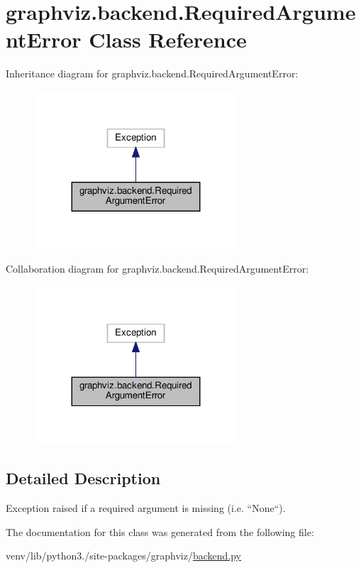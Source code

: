 \hypertarget{classgraphviz_1_1backend_1_1RequiredArgumentError}{}\section{graphviz.\+backend.\+Required\+Argument\+Error Class Reference}
\label{classgraphviz_1_1backend_1_1RequiredArgumentError}


Inheritance diagram for graphviz.\+backend.\+Required\+Argument\+Error\+:
\nopagebreak
\begin{figure}[H]
\begin{center}
\leavevmode
\includegraphics[width=215pt]{classgraphviz_1_1backend_1_1RequiredArgumentError__inherit__graph}
\end{center}
\end{figure}


Collaboration diagram for graphviz.\+backend.\+Required\+Argument\+Error\+:
\nopagebreak
\begin{figure}[H]
\begin{center}
\leavevmode
\includegraphics[width=215pt]{classgraphviz_1_1backend_1_1RequiredArgumentError__coll__graph}
\end{center}
\end{figure}


\subsection{Detailed Description}
\begin{DoxyVerb}Exception raised if a required argument is missing (i.e. ``None``).\end{DoxyVerb}
 

The documentation for this class was generated from the following file\+:\begin{DoxyCompactItemize}
\item 
venv/lib/python3./site-\/packages/graphviz/\hyperlink{backend_8py}{backend.\+py}\end{DoxyCompactItemize}
